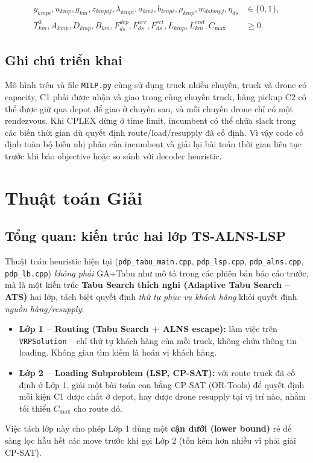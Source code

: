 \documentclass[12pt,a4paper]{article}
\begin{document}
\begin{align*}
y_{kmpi},u_{kmp},g_{km},z_{kmpij},\lambda_{kmpi}, a_{kmi},b_{kmpi},\rho_{kmp},w_{dskmpj},\eta_{ds} &\in\{0,1\},\\
T^0_{km},A_{kmp},D_{kmp},B_{km}, F^{dep}_{ds},F^{arr}_{ds},F^{ret}_{ds},L_{kmp},L^{end}_{km},C_{\max} &\ge0.
\end{align*}

\subsection{Ghi chú triển khai}

Mô hình trên và file \texttt{MILP.py} cùng sử dụng truck nhiều chuyến, truck và drone
có capacity, C1 phải được nhận và giao trong cùng chuyến truck, hàng pickup C2 có thể
được giữ qua depot để giao ở chuyến sau, và mỗi chuyến drone chỉ có một rendezvous.
Khi CPLEX dừng ở time limit, incumbent có thể chứa slack trong các biến thời gian dù
quyết định route/load/resupply đã cố định. Vì vậy code cố định toàn bộ biến nhị phân
của incumbent và giải lại bài toán thời gian liên tục trước khi báo objective hoặc so
sánh với decoder heuristic.

\section{Thuật toán Giải}
\label{sec:algorithm}

\subsection{Tổng quan: kiến trúc hai lớp TS-ALNS-LSP}

Thuật toán heuristic hiện tại (\texttt{pdp\_tabu\_main.cpp}, \texttt{pdp\_lsp.cpp},
\texttt{pdp\_alns.cpp}, \texttt{pdp\_lb.cpp}) \emph{không phải} GA+Tabu như mô tả
trong các phiên bản báo cáo trước, mà là một kiến trúc \textbf{Tabu Search thích nghi
(Adaptive Tabu Search -- ATS)} hai lớp, tách biệt quyết định \emph{thứ tự phục vụ
khách hàng} khỏi quyết định \emph{nguồn hàng/resupply}:
\begin{itemize}
    \item \textbf{Lớp 1 -- Routing (Tabu Search + ALNS escape):} làm việc trên
    \texttt{VRPSolution} -- chỉ thứ tự khách hàng của mỗi truck, không chứa thông tin
    loading. Không gian tìm kiếm là hoán vị khách hàng.
    \item \textbf{Lớp 2 -- Loading Subproblem (LSP, CP-SAT):} với route truck đã cố
    định ở Lớp 1, giải một bài toán con bằng CP-SAT (OR-Tools) để quyết định mỗi
    kiện C1 được chất ở depot, hay được drone resupply tại vị trí nào, nhằm
    tối thiểu $C_{\max}$ cho route đó.
\end{itemize}
Việc tách lớp này cho phép Lớp 1 dùng một \textbf{cận dưới (lower bound)} rẻ để
sàng lọc hầu hết các move trước khi gọi Lớp 2 (tốn kém hơn nhiều vì phải giải CP-SAT).
\end{document}
